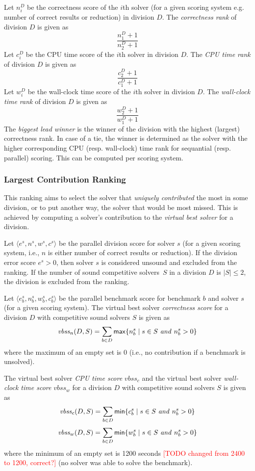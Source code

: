 \documentclass[12pt]{article}
\newcommand{\rem}[1]{\textcolor{red}{[#1]}}
\newcommand{\todo}[1]{\rem{TODO #1}}
\begin{document}
Let $n_i^D$ be the correctness score of the $i$th solver (for a given scoring
system e.g. number of correct results or reduction) in division $D$.
The \emph{correctness rank} of division $D$ is given as
\[
\frac{n_1^D+1}{n_2^D+1}
\]
Let $c_i^D$ be the CPU time score of the $i$th solver in division $D$.
The \emph{CPU time rank} of division $D$ is given as
\vspace{-1ex}
\[
\frac{c_2^D+1}{c_1^D+1}
\]
Let $w_i^D$ be the wall-clock time score of the $i$th solver in division $D$.
The \emph{wall-clock time rank} of division $D$ is given as
\vspace{-1ex}
\[
\frac{w_2^D+1}{w_1^D+1}
\]
The \emph{biggest lead winner} is the winner of the division with the highest
(largest) correctness rank. In case of a tie, the winner is determined as the
solver with the higher corresponding CPU (resp. wall-clock) time rank for
sequantial (resp. parallel) scoring.
This can be computed per scoring system.

\subsubsection{Largest Contribution Ranking}

This ranking aims to select the solver that \emph{uniquely contributed} the most in some division, or to put another way, the solver that would be most missed. This is achieved by computing a solver's contribution to the \emph{virtual best solver} for a division.

Let $\langle e^s, n^s, w^s, c^s \rangle$ be the parallel division score
for solver $s$ (for a given scoring system, i.e., $n$ is either number of correct
results or reduction).
If the division error score $e^s > 0$, then solver $s$ is considered unsound
and excluded from the ranking.
If the number of sound competitive solvers~$S$ in a division $D$ is $|S| \leq 2$, 
the division is excluded from the ranking.

Let $\langle e_b^s, n_b^s, w_b^s, c_b^s \rangle$ be the parallel benchmark
score for benchmark $b$ and solver $s$ (for a given scoring system). 
The virtual best solver \emph{correctness score} for a division $D$ with 
competitive sound solvers $S$ is given as 
\[
\mathit{vbss}_n(D,S) = \sum_{b \in D} {\sf max}\{ n_b^s \mid s \in S ~\mathit{and}~ n_b^s > 0 \}
\]
where the maximum of an empty set is 0 (i.e., no contribution if a benchmark
is unsolved).

The virtual best solver \emph{CPU time score} $\mathit{vbss}_c$ and
the virtual best solver \emph{wall-clock time score} $\mathit{vbss}_w$ for a
division $D$ with competitive sound solvers $S$ is given as 
\[
\mathit{vbss}_c(D,S) = \sum_{b \in D} {\sf min}\{ c_b^s \mid s \in S ~\mathit{and}~ n_b^s > 0 \}
\]
\[
\mathit{vbss}_w(D,S) = \sum_{b \in D} {\sf min}\{ w_b^s \mid s \in S ~\mathit{and}~ n_b^s > 0 \}
\]
where the minimum of an empty set is 1200 seconds \todo{changed from 2400 to 1200, correct?}
(no solver was able to solve the benchmark).
\end{document}
